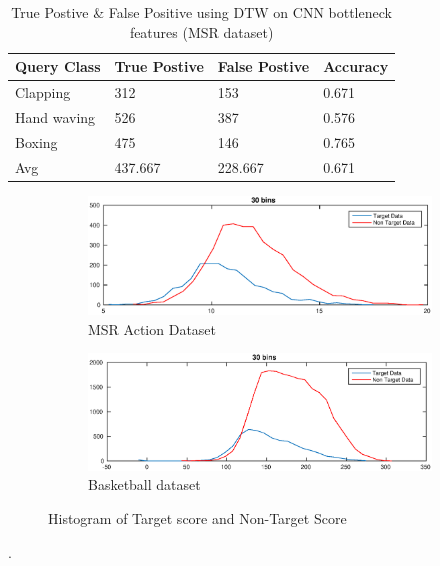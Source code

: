 \begin{table}[h]
\centering
\begin{tabular}{|l|l|l|l|}
\hline
Query Class & True Postive & False Postive & Accuracy \\ \hline
Clapping    &312	&153	&0.671\\
Hand waving &526	&387	&0.576\\
Boxing      &475	&146	&0.765\\
\hline
Avg	&437.667	&228.667	&0.671\\
\hline  
\end{tabular}
\caption[Event classification using DTW on CNN bottleneck features (MSR Action dataset \RN{2}) ]{True Postive \& False Positive using DTW on CNN bottleneck features (MSR dataset)}
\label{table:cnn_dtw_res_msr}
\end{table} 
\pagebreak
\begin{figure}[ht]
        \centering
        \begin{subfigure}[b]{0.9\textwidth}
        		\centering
        		\includegraphics[width=\textwidth]{./imgs/MSR_DTW.eps}
        		\caption{MSR Action Dataset}
        \end{subfigure}
        
        \begin{subfigure}[b]{0.9\textwidth}
        			\centering
                \includegraphics[width=\textwidth]{./imgs/Basket_DTW.eps}
                \caption{Basketball dataset}
        \end{subfigure}
        \caption{ Histogram of Target score and Non-Target Score}
        \label{fig:dtw_score}
\end{figure}.

